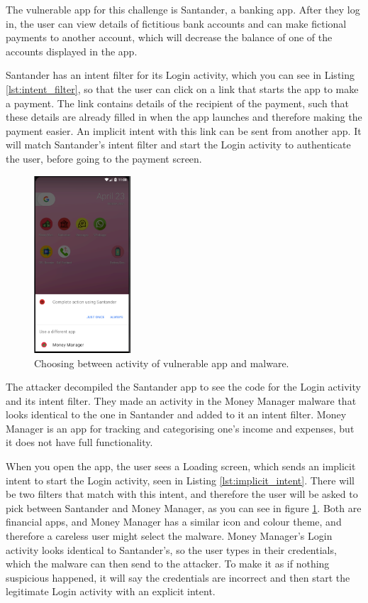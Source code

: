    The vulnerable app for this challenge is Santander, a banking app. After they log in, the user can view details of fictitious bank accounts and can make fictional payments to another account, which will decrease the balance of one of the accounts displayed in the app.
    
    Santander has an intent filter for its Login activity, which you can see in Listing \ref{lst:intent_filter}, so that the user can click on a link that starts the app to make a payment. The link contains details of the recipient of the payment, such that these details are already filled in when the app launches and therefore making the payment easier. An implicit intent with this link can be sent from another app. It will match Santander's intent filter and start the Login activity to authenticate the user, before going to the payment screen.
    
    \begin{figure}
        \centering
        \includegraphics[width=0.32\textwidth]{graphics/activity_hijack.PNG}
        \caption{Choosing between activity of vulnerable app and malware.}
        \label{fig:activity_hijack}
    \end{figure}

    The attacker decompiled the Santander app to see the code for the Login activity and its intent filter. They made an activity in the Money Manager malware that looks identical to the one in Santander and added to it an intent filter. Money Manager is an app for tracking and categorising one's income and expenses, but it does not have full functionality.
    
    When you open the app, the user sees a Loading screen, which sends an implicit intent to start the Login activity, seen in Listing \ref{lst:implicit_intent}. There will be two filters that match with this intent, and therefore the user will be asked to pick between Santander and Money Manager, as you can see in figure \ref{fig:activity_hijack}. Both are financial apps, and Money Manager has a similar icon and colour theme, and therefore a careless user might select the malware. Money Manager's Login activity looks identical to Santander's, so the user types in their credentials, which the malware can then send to the attacker. To make it as if nothing suspicious happened, it will say the credentials are incorrect and then start the legitimate Login activity with an explicit intent.
    
